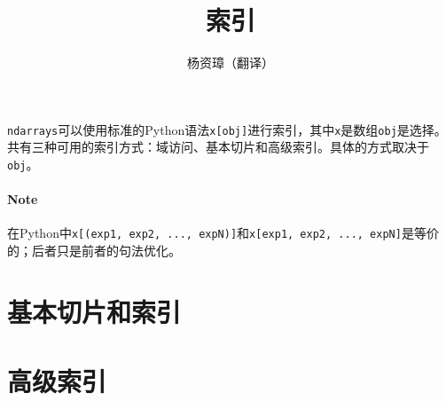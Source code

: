 \documentclass{ctexart}
\title{索引}
\author{杨资璋（翻译）}
\date{}
\begin{document}
\maketitle

\lstinline{ndarrays}可以使用标准的Python语法\lstinline{x[obj]}进行索引，其中\lstinline{x}是数组\lstinline{obj}是选择。共有三种可用的索引方式：域访问、基本切片和高级索引。具体的方式取决于\lstinline{obj}。

\paragraph{Note} 在Python中\lstinline{x[(exp1, exp2, ..., expN)]}和\lstinline{x[exp1, exp2, ..., expN]}是等价的；后者只是前者的句法优化。

\section{基本切片和索引}

\section{高级索引}

\end{document}
